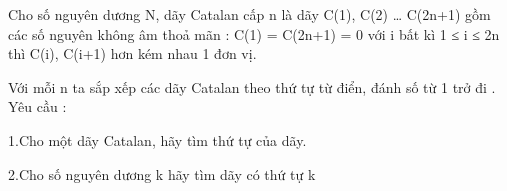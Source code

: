 Cho số nguyên dương N, dãy Catalan cấp n là dãy C(1), C(2) … C(2n+1) gồm các số nguyên không âm thoả mãn : C(1) = C(2n+1) = 0 với i bất kì 1 ≤ i ≤ 2n thì C(i), C(i+1) hơn kém nhau 1 đơn vị.

Với mỗi n ta sắp xếp các dãy Catalan theo thứ tự từ điển, đánh số từ 1 trở đi . Yêu cầu :

1.Cho một dãy Catalan, hãy tìm thứ tự của dãy.

2.Cho số nguyên dương k hãy tìm dãy có thứ tự k